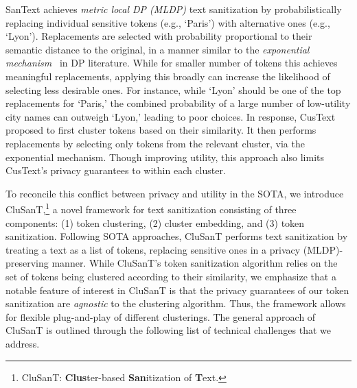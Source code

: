 \documentclass[11pt]{article}
\newcommand{\clusant}{CluSanT\xspace}
\begin{document}
SanText achieves {\em metric local DP (MLDP)} text sanitization by probabilistically replacing individual sensitive tokens (e.g., `Paris') with alternative ones (e.g., `Lyon'). Replacements are selected with probability proportional to their semantic distance to the original, in a manner similar to the {\em exponential mechanism}~\cite{mcsherry2007mechanism} in DP literature. 
While for smaller number of tokens this achieves meaningful replacements, applying this broadly can 
increase the likelihood of selecting less desirable ones. 
%
For instance, while `Lyon' should be one of the top replacements for `Paris,' the combined probability of a large number of low-utility city names can outweigh `Lyon,' leading to poor choices.
%
%
In response, CusText proposed to first cluster tokens based on their similarity. It then performs replacements by selecting only tokens from the relevant cluster, via the exponential mechanism.  
%
Though improving utility, this approach also limits CusText's privacy guarantees to within each cluster.


To reconcile this conflict between privacy and utility in the SOTA, we  introduce \clusant,\footnote{\clusant: \textbf{Clus}ter-based \textbf{San}itization of \textbf{T}ext.} a novel framework for text sanitization consisting of three components: (1) token clustering, (2) cluster embedding, and (3) token sanitization. Following  SOTA approaches, \clusant performs text sanitization by treating a text as a list of tokens, replacing sensitive ones in a privacy (MLDP)-preserving manner.  %
While \clusant's token sanitization algorithm relies on the set of tokens being clustered according to their similarity, we emphasize that a notable feature of interest in \clusant is that the privacy guarantees of our token sanitization are {\em agnostic} to the clustering algorithm. 
Thus, the framework allows for flexible plug-and-play of different clusterings.
The general approach of \clusant is outlined through the following list of technical challenges that we address.
\end{document}
